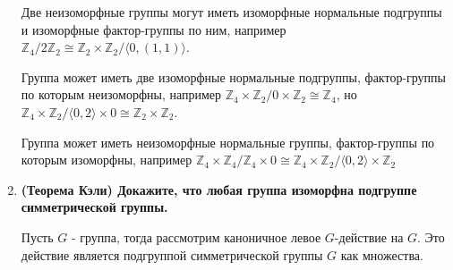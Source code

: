 \documentclass{article}
\begin{document}
\begin{enumerate}
        Две неизоморфные группы могут иметь изоморфные нормальные подгруппы и
        изоморфные фактор-группы по ним, например $\mathbb{Z}_4/2\mathbb{Z}_2
        \cong \mathbb{Z}_2\times\mathbb{Z}_2/\langle 0,(1,1)\rangle$.

        Группа может иметь две изоморфные нормальные подгруппы, фактор-группы по
        которым неизоморфны, например $\mathbb{Z}_4\times\mathbb{Z}_2/0\times\mathbb{Z}_2
        \cong\mathbb{Z}_4$, но $\mathbb{Z}_4\times\mathbb{Z}_2/\langle 0,2\rangle\times 0
        \cong\mathbb{Z}_2\times\mathbb{Z}_2$.

        Группа может иметь неизоморфные нормальные группы, фактор-группы по
        которым изоморфны, например $\mathbb{Z}_4\times\mathbb{Z}_4/\mathbb{Z}_4
        \times 0\cong\mathbb{Z}_4\times\mathbb{Z}_2/\langle0,2\rangle\times\mathbb{Z}_2$

    \item \textbf{(Теорема Кэли) Докажите, что любая группа изоморфна подгруппе
        симметрической группы.}

        Пусть $G$ - группа, тогда рассмотрим каноничное левое $G$-действие на $G$.
        Это действие является подгруппой симметрической группы $G$ как множества.
\end{enumerate}
\end{document}
